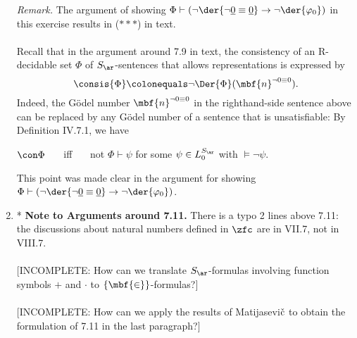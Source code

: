 \begin{enumerate}[1.]
\textit{Remark.} The argument of showing $\Phi \vdash (\neg\der{\neg\underline{0} \equiv \underline{0}} \rightarrow \neg\der{\varphi_0})$ in this exercise results in ($***$) in text.\\
\ \\
Recall that in the argument around 7.9 in text, the consistency of an R-decidable set $\Phi$ of $S_\ar$-sentences that allows representations is expressed by
\[
\consis{\Phi} \colonequals \neg\Der{\Phi}(\mbf{n}^{\neg 0 \equiv 0}).
\]
Indeed, the G\"{o}del number $\mbf{n}^{\neg 0 \equiv 0}$ in the righthand-side sentence above can be replaced by any G\"{o}del number of a sentence that is unsatisfiable: By Definition IV.7.1, we have
\begin{center}
$\con \Phi$ \ \ \ iff \ \ \ not $\Phi \vdash \psi$ for some $\psi \in L_0^{S_\ar}$ with $\models 
\neg\psi$.
\end{center}
This point was made clear in the argument for showing $\Phi \vdash (\neg\der{\neg\underline{0} \equiv \underline{0}} \rightarrow \neg\der{\varphi_0})$.
%
\item* \textbf{Note to Arguments around 7.11.} There is a typo 2 lines above 7.11: the discussions about natural numbers defined in $\zfc$ are in VII.7, not in VIII.7.\\
\ \\
$[$INCOMPLETE: How can we translate $S_\ar$-formulas involving function symbols $+$ and $\cdot$ to $\{ \mbf{\in} \}$-formulas?$]$\\
\ \\
$[$INCOMPLETE: How can we apply the results of Matijasevi$\check{\rm c}$ to obtain the formulation of 7.11 in the last paragraph?$]$
\end{enumerate}
